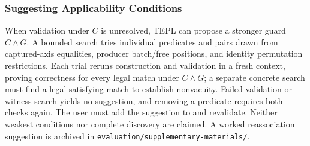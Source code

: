 \subsubsection{Suggesting Applicability Conditions}
\label{app:condition-suggestions}
When validation under $C$ is unresolved, TEPL can propose a stronger guard
$C\land G$. A bounded search tries individual predicates and pairs drawn
from captured-axis equalities, producer batch/free positions, and identity
permutation restrictions. Each trial reruns construction and validation in
a fresh context, proving correctness for every legal match under $C\land G$;
a separate concrete search must find a legal satisfying match to establish
nonvacuity. Failed validation or witness search yields no suggestion, and
removing a predicate requires both checks again. The user must add the
suggestion to  and revalidate. Neither weakest conditions nor
complete discovery are claimed. A worked reassociation suggestion is
archived in \nolinkurl{evaluation/supplementary-materials/}.
